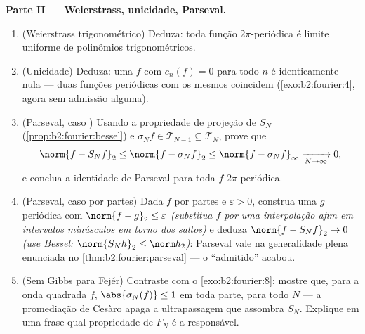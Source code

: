 \begin{problem}
\medskip
\noindent\textbf{Parte II --- Weierstrass, unicidade,
Parseval.}
\begin{enumerate}[resume]
  \item (Weierstrass trigonométrico) Deduza: toda função 
        $2\pi$-periódica é limite uniforme de
        polinômios trigonométricos.
  \item (Unicidade) Deduza: uma $f$  com $c_n(f) = 0$
        para todo $n$ é identicamente nula --- duas funções
        periódicas  com os mesmos 
        coincidem (\cref{exo:b2:fourier:4}, agora sem
        admissão alguma).
  \item (Parseval, caso ) Usando a propriedade de projeção
        de $S_N$ (\cref{prop:b2:fourier:bessel}) e
        $\sigma_Nf \in \mathcal T_{N-1} \subseteq \mathcal
        T_N$, prove que
        \[
        \norm{f - S_Nf}_2 \leq \norm{f - \sigma_Nf}_2
        \leq \norm{f - \sigma_Nf}_\infty
        \xrightarrow[N\to\infty]{} 0 ,
        \]
        e conclua a identidade de Parseval para toda $f$
        \emph{} $2\pi$-periódica.
  \item (Parseval, caso  por partes) Dada $f$
         por partes e $\varepsilon > 0$, construa uma
        $g$ periódica  com $\norm{f - g}_2 \leq
        \varepsilon$ \emph{(substitua $f$ por uma
        interpolação afim em intervalos minúsculos em torno dos saltos)}
        e deduza $\norm{f - S_Nf}_2 \to 0$
        \emph{(use Bessel: $\norm{S_Nh}_2 \leq \norm h_2$)}:
        Parseval vale na generalidade plena enunciada no
        \cref{thm:b2:fourier:parseval} --- o ``admitido''
        acabou.
  \item (Sem Gibbs para Fejér) Contraste com o
        \cref{exo:b2:fourier:8}: mostre que, para a onda quadrada
        $f$, $\abs{\sigma_N(f)} \leq 1$ em toda parte, para todo
        $N$ --- a promediação de Cesàro apaga a ultrapassagem que
        assombra $S_N$. Explique em uma frase qual propriedade
        de $F_N$ é a responsável.
\end{enumerate}


\end{problem}
